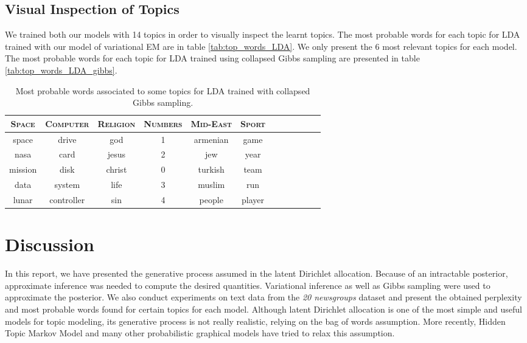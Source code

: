 \documentclass{article}
\begin{document}
\subsection{Visual Inspection of Topics}
We trained both our models with 14 topics in order to visually inspect the learnt topics. The most probable words for each topic for LDA trained with our model of variational EM are in table \ref{tab:top_words_LDA}. We only present the 6 most relevant topics for each model. The most probable words for each topic for LDA trained using collapsed Gibbs sampling are presented in table \ref{tab:top_words_LDA_gibbs}. 

\begin{table}[htb]
\caption{\label{tab:top_words_LDA_gibbs} Most probable words associated to some topics for LDA trained with collapsed Gibbs sampling.}
\vskip 0.15in
\begin{center}
\begin{small}
\begin{tabular}{c|c|c|c|c|c|c|c|c|c|c|c}
\textsc{Space} & \textsc{Computer} & \textsc{Religion} & \textsc{Numbers} & \textsc{Mid-East} & \textsc{Sport}\\
\hline 
space & drive & god & 1 & armenian & game\\
nasa & card & jesus & 2 & jew & year \\
mission & disk & christ & 0 &  turkish & team  \\
data & system & life & 3 &  muslim & run \\
lunar & controller & sin & 4 &  people & player 
\end{tabular}
\end{small}
\end{center}
\label{default}
\end{table}%



\section{Discussion}

In this report, we have presented the generative process assumed in the latent Dirichlet allocation. Because of an intractable posterior, approximate inference was needed to compute the desired quantities. Variational inference as well as Gibbs sampling were used to approximate the posterior. We also conduct experiments on text data from the \textit{20 newsgroups} dataset and present the obtained perplexity and most probable words found for certain topics for each model. Although latent Dirichlet allocation is one of the most simple and useful models for topic modeling, its generative process is not really realistic, relying on the bag of words assumption. More recently, Hidden Topic Markov Model \cite{gruber2007hidden} and many other probabilistic graphical models have tried to relax this assumption.

\nocite{blei2012probabilistic}



\end{document}
